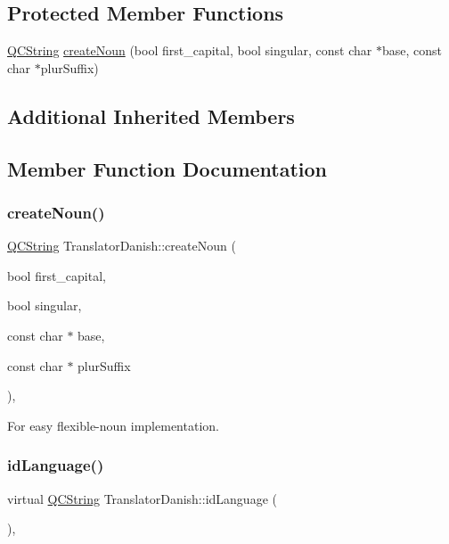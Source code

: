 \subsection*{Protected Member Functions}
\begin{DoxyCompactItemize}
\item 
\mbox{\hyperlink{class_q_c_string}{Q\+C\+String}} \mbox{\hyperlink{class_translator_danish_ac3ca30b3b28709fda517d2970d12cf18}{create\+Noun}} (bool first\+\_\+capital, bool singular, const char $\ast$base, const char $\ast$plur\+Suffix)
\end{DoxyCompactItemize}
\subsection*{Additional Inherited Members}


\subsection{Member Function Documentation}
\mbox{\label{class_translator_danish_ac3ca30b3b28709fda517d2970d12cf18}} 
\subsubsection{\texorpdfstring{createNoun()}{createNoun()}}
{\footnotesize\ttfamily \mbox{\hyperlink{class_q_c_string}{Q\+C\+String}} Translator\+Danish\+::create\+Noun (\begin{DoxyParamCaption}\item[{bool}]{first\+\_\+capital,  }\item[{bool}]{singular,  }\item[{const char $\ast$}]{base,  }\item[{const char $\ast$}]{plur\+Suffix }\end{DoxyParamCaption})\hspace{0.3cm}{\ttfamily [inline]}, {\ttfamily [protected]}}

For easy flexible-\/noun implementation. \mbox{\label{class_translator_danish_a9a79ab8cb2b324ba59a0c995d6da83dd}} 
\subsubsection{\texorpdfstring{idLanguage()}{idLanguage()}}
{\footnotesize\ttfamily virtual \mbox{\hyperlink{class_q_c_string}{Q\+C\+String}} Translator\+Danish\+::id\+Language (\begin{DoxyParamCaption}{ }\end{DoxyParamCaption})\hspace{0.3cm}{\ttfamily [inline]}, {\ttfamily [virtual]}}

